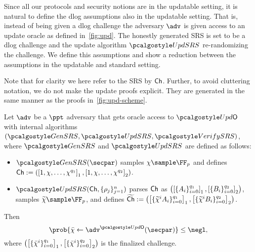  Since all our protocols and security notions are in the updatable setting, it is natural to define the dlog assumptions also in the updatable setting. That is, instead of being given a dlog challenge the adversary $\adv$ is given access to an update oracle as defined in~\cref{fig:upd}. The honestly generated SRS is set to be a dlog challenge and the update algorithm $\upd$ re-randomizing the challenge. We define this assumptions and show a reduction between the assumptions in the updatable and standard setting. 

Note that for clarity we here refer to the SRS by $\mathsf{Ch}$. Further, to avoid cluttering notation, we do not make the update proofs explicit. They are generated in the same manner as the proofs in~\cref{fig:upd-scheme}.
	

\begin{definition}\label{def:udlog}
	Let $\adv$ be a $\ppt$ adversary that gets oracle access to $\initU$ with internal algorithms $(\kgen, \upd, \verifyCRS)$, where $\kgen$ and $\upd$ are defined as follows:
	\begin{itemize}
	\item $\kgen(\secpar)$ samples $\chi \sample \FF_p$ and defines 
		$\mathsf{Ch}:=(\left[1, \chi, \ldots,
			\chi^{q_1}\right]_{1}, \left[1, \chi, \ldots, \chi^{q_2}
		\right]_{2})$.
	\item $\upd(\Ch, \{\rho_j \}_{j=1}^n)$ 
	parses $\mathsf{Ch}$ as $\left( \left[\{A_i\}_{i = 0}^{q_1}\right]_{1},
	\left[\{B_i\}_{i = 0}^{q_2}\right]_{2} \right)$, samples
	$\widetilde{\chi} \sample \FF_p$, and defines
	$\widetilde{\mathsf{Ch}} := 
	\left( \left[\{\widetilde{\chi}^i A_i\}_{i = 0}^{q_1}\right]_{1},
	\left[\{\widetilde{\chi}^i B_i\}_{i = 0}^{q_2}\right]_{2} \right)$.
	\end{itemize}
	Then
	\[
	\prob{\bar{\chi} \gets \adv^{\initU}(\secpar)} \leq \negl,
	\]
	where $\left( \left[\{\bar{\chi}^i\}_{i = 0}^{q_1}\right]_{1},
	\left[\{\bar{\chi}^i\}_{i = 0}^{q_2}\right]_{2} \right)$ is the finalized challenge.
\end{definition}



